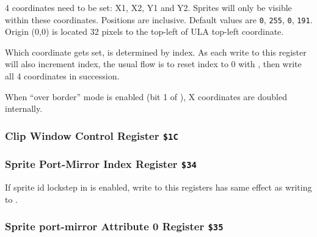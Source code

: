 \begin{NextPort}
\end{NextPort}

4 coordinates need to be set: X1, X2, Y1 and Y2. Sprites will only be visible within these coordinates. Positions are inclusive. Default values are {\tt 0}, {\tt 255}, {\tt 0}, {\tt 191}. Origin (0,0) is located 32 pixels to the top-left of ULA top-left coordinate.

Which coordinate gets set, is determined by index. As each write to this register will also increment index, the usual flow is to reset index to 0 with , then write all 4 coordinates in succession.

When ``over border'' mode is enabled (bit 1 of ), X coordinates are doubled internally.


\subsubsection{Clip Window Control Register {\tt \$1C}}



\subsubsection{Sprite Port-Mirror Index Register {\tt \$34}}

If sprite id lockstep in  is enabled, write to this registers has same effect as writing to .

\begin{NextPort}
\end{NextPort}


\subsubsection{Sprite port-mirror Attribute 0 Register {\tt \$35}}

\begin{NextPort}
\end{NextPort}


